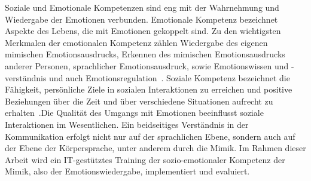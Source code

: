 Soziale und Emotionale Kompetenzen sind eng mit der Wahrnehmung und Wiedergabe der Emotionen verbunden. Emotionale Kompetenz bezeichnet Aspekte des Lebens, die mit Emotionen gekoppelt sind. Zu den wichtigsten Merkmalen der emotionalen Kompetenz zählen Wiedergabe des eigenen mimischen Emotionsausdrucks, Erkennen des mimischen Emotionsausdrucks anderer Personen, sprachlicher Emotionsausdruck, sowie Emotionswissen und -verständnis und auch Emotionsregulation~\cite{Pfeiffer.2012}. Soziale Kompetenz bezeichnet die Fähigkeit, persönliche Ziele in sozialen Interaktionen zu erreichen und positive Beziehungen über die Zeit und über verschiedene Situationen aufrecht zu erhalten~\cite{Pfeiffer.2012}.Die Qualität des Umgangs mit Emotionen beeinflusst soziale Interaktionen im Wesentlichen.
Ein beidseitiges Verständnis in der Kommunikation erfolgt nicht nur auf der sprachlichen Ebene, sondern auch auf der Ebene der Körpersprache, unter anderem durch die Mimik.
Im Rahmen dieser Arbeit wird ein IT-gestütztes Training der sozio-emotionaler Kompetenz der Mimik, also der Emotionswiedergabe, implementiert und evaluiert.

